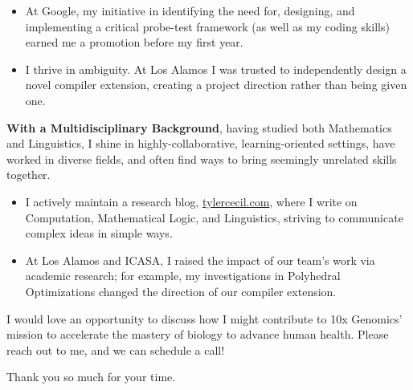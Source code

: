 \documentclass[sans, a4paper, 11pt]{article}
\newcommand{\cvcolor}[1]{{\color{MidnightBlue}#1}}
\renewcommand{\hl}[1]{\cvcolor{\textbf{#1}}}
\begin{document}
\begin{adjustwidth}{40pt}{40pt}
  \begin{itemize}

    \item At Google, my initiative in identifying the need for, designing, and
      implementing a critical probe-test framework (as well as my coding
      skills) earned me a promotion before my first year.

    \item I thrive in ambiguity. At Los Alamos I was trusted to independently
      design a novel compiler extension, creating a project direction rather
      than being given one.


  \end{itemize}\smallskip


  \hl{With a Multidisciplinary Background}, having studied both Mathematics and
  Linguistics, I shine in highly-collaborative, learning-oriented settings,
  have worked in diverse fields, and often find ways to bring seemingly
  unrelated skills together.\smallskip

  \begin{itemize}

    \item I actively maintain a research blog, \url{tylercecil.com}, where I
      write on Computation, Mathematical Logic, and Linguistics, striving to
      communicate complex ideas in simple ways.

    \item At Los Alamos and ICASA, I raised the impact of our team's work via
      academic research; for example, my investigations in Polyhedral
      Optimizations changed the direction of our compiler extension.

  \end{itemize} \medskip

  I would love an opportunity to discuss how I might contribute to 10x
  Genomics' mission to accelerate the mastery of biology to advance human
  health. Please reach out to me, and we can schedule a call!  \bigskip

  Thank you so much for your time.


\end{adjustwidth}
\end{document}
